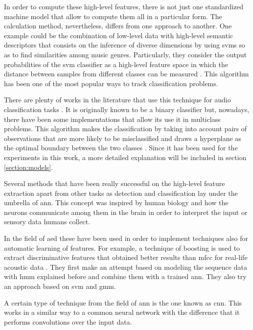 	In order to compute these high-level features, there is not just one standardized machine model that allow to compute them all in a particular form. The calculation method, nevertheless, differs from one approach to another. One example could be the combination of low-level data with high-level semantic descriptors that consists on the inference of diverse dimensions by using \acrlong{svm}s so as to find similarities among music genres. Particularly, they consider the output probabilities of the \acrshort{svm} classifier as a high-level feature space in which the distance between samples from different classes can be measured \cite{Bogdanov2011}. This algorithm has been one of the most popular ways to track classification problems.
	 
	There are plenty of works in the literature that use this technique for audio classification tasks \cite{Jiang2005} \cite{Geiger2013} \cite{Barchiesi2015}. It is originally known to be a binary classifier but, nowadays, there have been some implementations that allow its use it in multiclass problems. This algorithm makes the classification by taking into account pairs of observations that are more likely to be misclassified and draws a hyperplane as the optimal boundary between the two classes \cite{Fu2011}. Since it has been used for the experiments in this work, a more detailed explanation will be included in section \ref{section:models}.
	
	Several methods that have been really successful on the high-level feature extraction apart from other tasks as detection and classification lay under the umbrella of \acrfull{ann}. This concept was inspired by human biology and how the neurons communicate among them in the brain in order to interpret the input or sensory data humans collect. 
	
	In the field of \acrshort{aed} these have been used in order to implement techniques also for automatic learning of features. For example, a technique of boosting is used to extract discriminative features that obtained better results than \acrshort{mfcc} for real-life acoustic data \cite{Zhuang2010}. They first make an attempt based on modeling the sequence data with \acrshort{hmm} explained before and combine them with a trained \acrshort{ann}. They also try an approach based on \acrshort{svm} and \acrshort{gmm}. 
	
	A certain type of technique from the field of \acrshort{ann} is the one known as \acrfull{cnn}. This works in a similar way to a common neural network with the difference that it performs convolutions over the input data.
	
